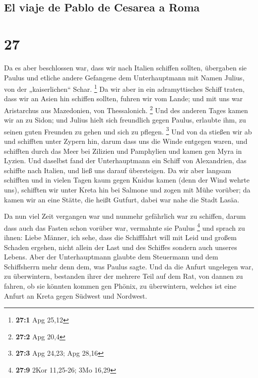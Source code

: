 \hypertarget{el-viaje-de-pablo-de-cesarea-a-roma}{%
\subsection{El viaje de Pablo de Cesarea a
Roma}\label{el-viaje-de-pablo-de-cesarea-a-roma}}

\hypertarget{section-26}{%
\section{27}\label{section-26}}

 Da es aber beschlossen war, dass wir nach Italien
schiffen sollten, übergaben sie Paulus und etliche andere Gefangene dem
Unterhauptmann mit Namen Julius, von der „kaiserlichen`` Schar.
\footnote{\textbf{27:1} Apg 25,12}  Da wir aber in ein
adramyttisches Schiff traten, dass wir an Asien hin schiffen sollten,
fuhren wir vom Lande; und mit uns war Aristarchus aus Mazedonien, von
Thessalonich. \footnote{\textbf{27:2} Apg 20,4}  Und des
anderen Tages kamen wir an zu Sidon; und Julius hielt sich freundlich
gegen Paulus, erlaubte ihm, zu seinen guten Freunden zu gehen und sich
zu pflegen. \footnote{\textbf{27:3} Apg 24,23; Apg 28,16} 
Und von da stießen wir ab und schifften unter Zypern hin, darum dass uns
die Winde entgegen waren,  und schifften durch das Meer
bei Zilizien und Pamphylien und kamen gen Myra in Lyzien. 
Und daselbst fand der Unterhauptmann ein Schiff von Alexandrien, das
schiffte nach Italien, und ließ uns darauf übersteigen. 
Da wir aber langsam schifften und in vielen Tagen kaum gegen Knidus
kamen (denn der Wind wehrte uns), schifften wir unter Kreta hin bei
Salmone  und zogen mit Mühe vorüber; da kamen wir an eine
Stätte, die heißt Gutfurt, dabei war nahe die Stadt Lasäa.

 Da nun viel Zeit vergangen war und nunmehr gefährlich war
zu schiffen, darum dass auch das Fasten schon vorüber war, vermahnte sie
Paulus \footnote{\textbf{27:9} 2Kor 11,25-26; 3Mo 16,29} 
und sprach zu ihnen: Liebe Männer, ich sehe, dass die Schifffahrt will
mit Leid und großem Schaden ergehen, nicht allein der Last und des
Schiffes sondern auch unseres Lebens.  Aber der
Unterhauptmann glaubte dem Steuermann und dem Schiffsherrn mehr denn
dem, was Paulus sagte.  Und da die Anfurt ungelegen war,
zu überwintern, bestanden ihrer der mehrere Teil auf dem Rat, von dannen
zu fahren, ob sie könnten kommen gen Phönix, zu überwintern, welches ist
eine Anfurt an Kreta gegen Südwest und Nordwest.

